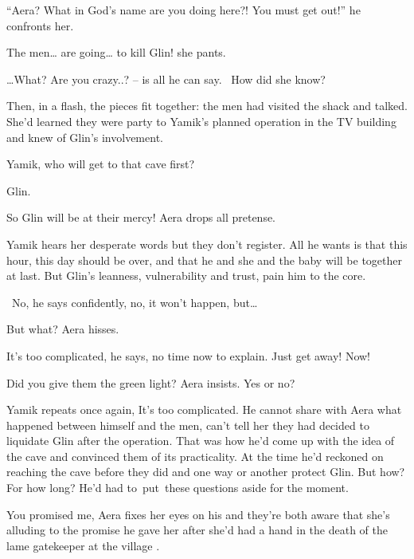 \documentclass[12pt]{book}
\begin{document}
{}``Aera? What in God's name are you doing here?! You must get out!'' he confronts her.

{\textquotedbl}The men{\dots} are going{\dots} to kill Glin!{\textquotedbl} she pants.

{{\dots}}{\textquotedbl}What?{ }Are you
crazy..?{\textquotedbl} -- is all he can say. \ How did she know?

Then, in a flash, the pieces fit together: the men had visited the shack and talked. She'd learned they were party to
Yamik's planned operation in the TV building and knew of Glin's involvement.

{\textquotedbl}Yamik, who will get to that cave first?{\textquotedbl}

{\textquotedbl}Glin.{\textquotedbl}

{\textquotedbl}So Glin will be at their mercy!{\textquotedbl} Aera drops all pretense.

Yamik hears her desperate words but they don't register. All he wants is that this hour, this day should be over, and
that he and she and the baby will be together at last. But Glin's leanness, vulnerability and trust, pain him to the
core{.}

\ {\textquotedbl}No,{\textquotedbl} he says{ }confidently,
{\textquotedbl}no,{ }it won't happen, but{\dots}{\textquotedbl}

{\textquotedbl}But what?{\textquotedbl} Aera hisses.

{\textquotedbl}It's too complicated,{\textquotedbl} he says, {\textquotedbl}no time now to explain. Just get away!
Now!{\textquotedbl}

{\textquotedbl}Did you give them the green light?{\textquotedbl} Aera insists. {\textquotedbl}Yes or no?{\textquotedbl}

Yamik repeats once again, {\textquotedbl}It's too complicated.{\textquotedbl} He
cannot{ }share with Aera what happened between himself and the men, can't tell
her they had decided to liquidate Glin after the operation. That was how he'd come up with the idea of the cave and
convinced them of its practicality. At the time he'd reckoned on reaching the cave before they did and one way or
another protect Glin. But how? For how long? He'd had to~put~these questions aside for the moment.

{\textquotedbl}You promised me,{\textquotedbl} Aera fixes her eyes on his and they're both aware that she's alluding to
the promise he gave her after she'd had a hand in the death of the lame gatekeeper at the village .
\end{document}
